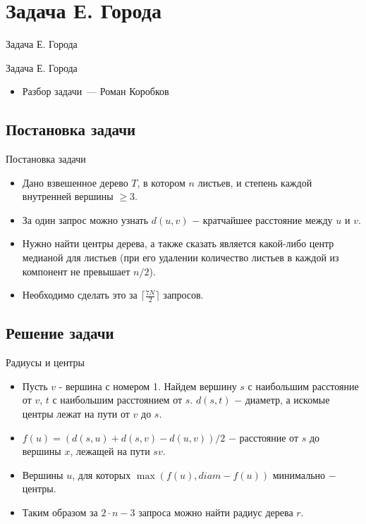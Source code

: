 \section{Задача Е. Города}

\begin{frame}[t]{Задача Е. Города}

  \vspace{2cm}
  \begin{center}
    \LARGE Задача Е. Города
  \end{center}
\end{frame}


\begin{frame}[t]{}
  \vspace{3cm}

  \begin{itemize}
    \item Разбор задачи~--- Роман Коробков
  \end{itemize}
\end{frame}



\subsection{Постановка задачи}

\begin{frame}[t]{Постановка задачи}
\begin{itemize}
    \item Дано взвешенное дерево $T$, в котором $n$ листьев, и степень каждой внутренней вершины $ \ge 3$.
    \item За один запрос можно узнать $d(u, v)$ $-$  кратчайшее расстояние между $u$ и $v$.
    \item Нужно найти центры дерева, а также сказать является какой-либо центр медианой для листьев (при его удалении количество листьев
    	в каждой из компонент не превышает $n / 2$).
    \item Необходимо сделать это за $ \lceil \frac{7N}{2} \rceil$ запросов.
\end{itemize}
\end{frame}

\subsection{Решение задачи}

\begin{frame}[t]{Радиусы и центры}
\begin{itemize}
	\item Пусть $v$ - вершина с номером 1. Найдем вершину $s$ с наибольшим расстояние от $v$, 
	$t$ с наибольшим расстоянием от $s$. $d(s, t)$ $-$ диаметр, а искомые центры лежат на пути от $v$ до $s$.
	\item $f(u) = (d(s, u) + d(s, v) - d(u, v)) / 2 $ $-$ расстояние от $s$ до вершины $x$, лежащей на пути $sv$.
	\item Вершины $u$, для которых $\max(f(u), diam - f(u))$ минимально $-$ центры.
	\item Таким образом за $2 \cdot n - 3$ запроса можно найти радиус дерева $r$.
\end{itemize}
\end{frame}


